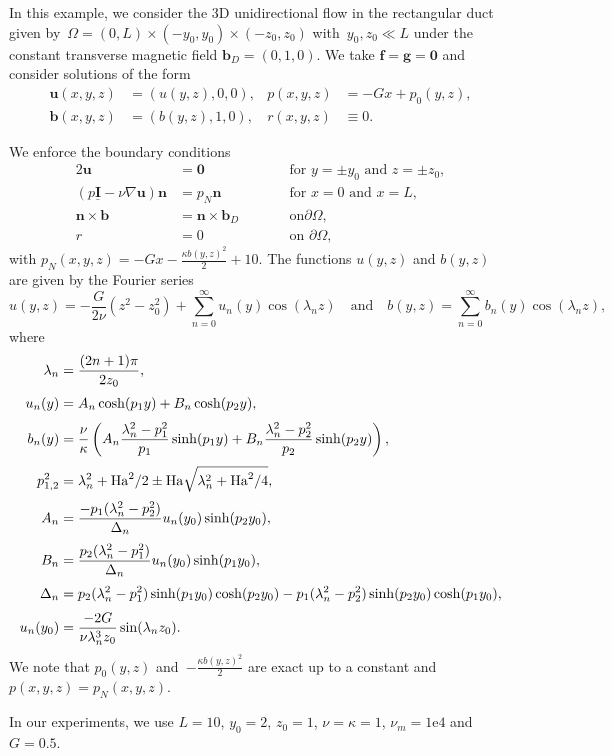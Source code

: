 \documentclass{article}
\newcommand{\uu}[1]{\boldsymbol #1}
\begin{document}
In this example, we consider the 3D unidirectional
flow in the rectangular duct given
by~$\Omega=(0,L)\times(-y_0,y_0)\times(-z_0,z_0)$ with~$y_0,z_0\ll
L$ under the constant transverse magnetic field $\uu{b}_D=(0,1,0)$. We take $\uu{f}=\uu{g}=\uu{0}$ and consider solutions of the
form
\begin{align*}
\uu{u}(x,y,z)& =(u(y,z), 0,0 ),&
p(x,y,z)& =-Gx+p_0(y,z),\\[0.1cm]
\uu{b}(x,y,z)& =(b(y,z),1,0),& r(x,y,z)& \equiv 0.
\end{align*}

We enforce the boundary conditions
\begin{alignat*}2
\uu{u} &=\uu{0} & \qquad &\mbox{for $y=\pm y_0$ and $z=\pm z_0$},\\[0.1cm]
(p\underline{\uu{I}}-\nu \nabla\uu{u}) \uu{n} &= p_N\uu{n} &\qquad
&\mbox{for $x=0$ and $x=L$},\\[0.1cm]
\uu{n} \times \uu{b}   &= \uu{n} \times \uu{b}_D & \qquad &\mbox{on
$\partial \Omega$},\\
r &= 0  & \qquad &\mbox{on $\partial \Omega$},
\end{alignat*}
with $p_N(x,y,z)=-Gx-\frac{\kappa {b(y,z)}^2}{2}+10$. The functions $u(y,z)$ and $b(y,z)$ are given by the Fourier
series
$$u(y,z) =  -\frac{G}{2\nu} (z^2-z_0^2) + \sum_{n=0}^\infty u_n(y)\cos(\lambda_n z) \quad \mbox{and} \quad b(y,z)=\sum_{n=0}^\infty b_n(y)\cos(\lambda_n z),$$
where
\begin{equation*}
\begin{split}
\lambda_n&=\frac{(2n+1)\pi}{2z_0},\\[0.1cm]
u_n(y)&=A_n\cosh(p_1y) + B_n\cosh(p_2y),\\[0.1cm]
b_n(y)&=\frac{\nu}{\kappa}\left(
A_n\frac{\lambda_n^2-p_1^2}{p_1}\sinh(p_1y) +
B_n\frac{\lambda_n^2-p_2^2}{p_2}\sinh(p_2y)\right),\\[0.1cm]
p_{1,2}^2&=\lambda_n^2+{\rm Ha}^2/2 \pm {\rm Ha}\sqrt{\lambda_n^2+{\rm Ha}^2/4},\\[0.1cm]
A_n&=\frac{-p_1(\lambda_n^2-p_2^2)}{\Delta_n}u_n(y_0)\sinh(p_2y_0),\\[0.1cm]
B_n&=\frac{p_2(\lambda_n^2-p_1^2)}{\Delta_n}u_n(y_0)\sinh(p_1y_0),\\[0.1cm]
\Delta_n&=p_2(\lambda_n^2-p_1^2)\sinh(p_1y_0)\cosh(p_2y_0)-p_1(\lambda_n^2-p_2^2)\sinh(p_2y_0)\cosh(p_1y_0),\\[0.1cm]
u_n(y_0)&=\frac{-2G}{\nu \lambda_n^3 z_0}\sin(\lambda_n z_0).
\end{split}
\end{equation*}
We note that $p_0(y,z)$ and~$-\frac{\kappa b(y,z)^2}{2}$ are exact up to a constant and $p(x,y,z) = p_N(x,y,z)$.


In our experiments, we use $L=10$, $y_0=2$, $z_0=1$, $\nu= \kappa =1$, $\nu_m = \mathrm{1e4}$ and $G=0.5$.
\end{document}
